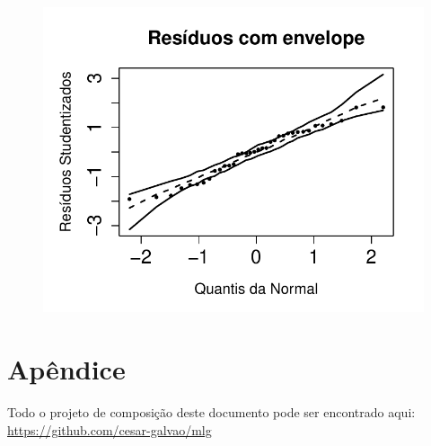 \documentclass[
  letterpaper,
  DIV=11,
  numbers=noendperiod]{scrartcl}
\begin{document}
\begin{figure}

{\centering \includegraphics{lista2_files/figure-pdf/unnamed-chunk-22-1.pdf}

}

\end{figure}

\hypertarget{apuxeandice}{%
\section{Apêndice}\label{apuxeandice}}

Todo o projeto de composição deste documento pode ser encontrado aqui:
\url{https://github.com/cesar-galvao/mlg}
\end{document}
